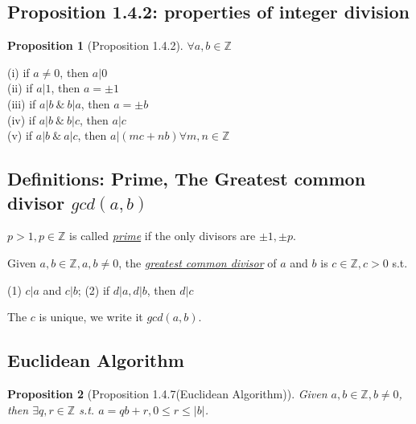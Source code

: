 \documentclass[11pt,a4paper]{article}
\newtheorem{proposition}{Proposition}
\begin{document}
\subsection{Proposition 1.4.2: properties of integer division}
\begin{proposition}[Proposition 1.4.2]
    $\forall a,b\in\mathbb{Z}$
\end{proposition}
(i) if $a\neq0$, then $a|0$\\
(ii) if $a|1$, then $a=\pm 1$\\
(iii) if $a|b\ \&\ b|a$, then $a=\pm b$\\
(iv) if $a|b\ \&\ b|c$, then $a|c$\\
(v) if $a|b\ \&\ a|c$, then $a|(mc+nb)\forall m,n\in\mathbb{Z}$\\

\subsection{Definitions: Prime, The Greatest common divisor $gcd(a,b)$}
$p > 1, p \in \mathbb{Z}$ is called
\underline{\textit{prime}} if the only divisors are
$\pm 1,\pm p$.

Given $a,b\in\mathbb{Z},a, b\neq 0$, the \underline{\textit{greatest common divisor}} of $a$ and $b$ is $c\in\mathbb{Z}, c>0$ s.t.

(1) $c|a$ and $c|b$; (2) if $d|a, d|b$, then $d|c$

The $c$ is unique, we write it $gcd(a,b)$.

\subsection{Euclidean Algorithm}
\begin{proposition}[Proposition 1.4.7(Euclidean Algorithm)]
    Given $a,b\in\mathbb{Z},b\neq 0$, then $\exists q,r\in \mathbb{Z}$ s.t. $a=qb+r, 0\leq r\leq |b|$.
\end{proposition}
\end{document}
